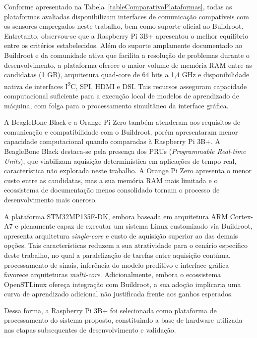 Conforme apresentado na Tabela~\ref{tableComparativoPlataformas}, todas as 
plataformas avaliadas disponibilizam interfaces de comunicação compatíveis 
com os sensores empregados neste trabalho, bem como suporte oficial ao 
Buildroot. Entretanto, observou-se que a Raspberry Pi 3B+ apresentou o 
melhor equilíbrio entre os critérios estabelecidos. Além do suporte 
amplamente documentado ao Buildroot e da comunidade ativa que facilita a 
resolução de problemas durante o desenvolvimento, a plataforma oferece o 
maior volume de memória RAM entre as candidatas (1 GB), arquitetura 
quad-core de 64 bits a 1,4 GHz e disponibilidade nativa de interfaces 
I\textsuperscript{2}C, SPI, HDMI e DSI. Tais recursos asseguram capacidade 
computacional suficiente para a execução local de modelos de aprendizado 
de máquina, com folga para o processamento simultâneo da interface 
gráfica.

A BeagleBone Black e a Orange Pi Zero também atenderam aos requisitos de 
comunicação e compatibilidade com o Buildroot, porém apresentaram menor 
capacidade computacional quando comparadas à Raspberry Pi 3B+. A 
BeagleBone Black destaca-se pela presença dos PRUs (\textit{Programmable 
Real-time Units}), que viabilizam aquisição determinística em aplicações 
de tempo real, característica não explorada neste trabalho. A Orange Pi 
Zero apresenta o menor custo entre as candidatas, mas a sua memória RAM 
mais limitada e o ecossistema de documentação menos consolidado tornam o 
processo de desenvolvimento mais oneroso.

A plataforma STM32MP135F-DK, embora baseada em arquitetura ARM Cortex-A7 e 
plenamente capaz de executar um sistema Linux customizado via Buildroot, 
apresenta arquitetura \textit{single-core} e custo de aquisição superior 
ao das demais opções. Tais características reduzem a sua atratividade para 
o cenário específico deste trabalho, no qual a paralelização de tarefas 
entre aquisição contínua, processamento de sinais, inferência do modelo 
preditivo e interface gráfica favorece arquiteturas \textit{multi-core}. 
Adicionalmente, embora o ecossistema OpenSTLinux ofereça integração com 
Buildroot, a sua adoção implicaria uma curva de aprendizado adicional não 
justificada frente aos ganhos esperados.

Dessa forma, a Raspberry Pi 3B+ foi selecionada como plataforma de 
processamento do sistema proposto, constituindo a base de hardware 
utilizada nas etapas subsequentes de desenvolvimento e validação.
